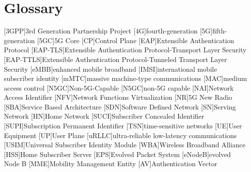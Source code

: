 \chapter{Glossary}

\footnotesize
\SingleSpacing

\begin{acronym}[AAAAAA]
	[3GPP]{3rd Generation Partnership Project}
	[4G]{fourth-generation}
	[5G]{fifth-generation}
	[5GC]{5G Core}
	[CP]{Control Plane}
	[EAP]{Extensible Authentication Protocol}
	[EAP-TLS]{Extensible Authentication Protocol-Transport Layer Security}
	[EAP-TTLS]{Extensible Authentication Protocol-Tunneled Transport Layer Security}
	[eMBB]{enhanced mobile broadband}
	[IMSI]{international mobile subscriber identity}
	[mMTC]{massive machine-type communications}
	[MAC]{medium access control}
	[N5GC]{Non-5G-Capable}
	[N5GC]{non-5G capable}
	[NAI]{Network Access Identifier}
	[NFV]{Network Functions Virtualization}
	[NR]{5G New Radio}
	[SBA]{Service Based Architecture}
	[SDN]{Software Defined Network}
	[SN]{Serving Network}
	[HN]{Home Network}
	[SUCI]{Subscriber Concealed Identifier}
	[SUPI]{Subscription Permanent Identifier}
	[TSN]{time-sensitive networks}
	[UE]{User Equipment}
	[UP]{User Plane}
	[uRLLC]{ultra-reliable low-latency communications}
	[USIM]{Universal Subscriber Identity Module}
	[WBA]{Wireless Broadband Alliance}
	[HSS]{Home Subscriber Server}
	[EPS]{Evolved Packet System}
	[eNodeB]{evolved Node B}
	[MME]{Mobility Management Entity}
	[AV]{Authentication Vector}
\end{acronym}
